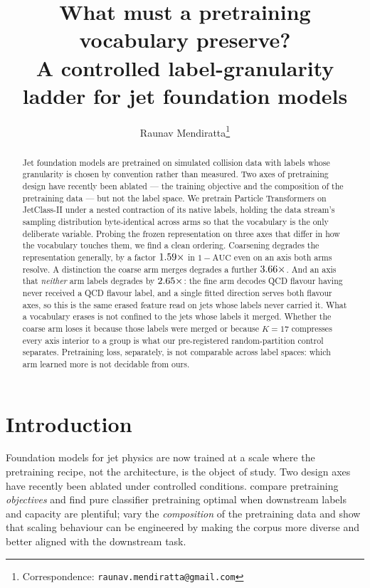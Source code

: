 \documentclass{article}
\title{What must a pretraining vocabulary preserve?\\
       A controlled label-granularity ladder for jet foundation models}
\author{%
  Raunav Mendiratta\thanks{Correspondence: \texttt{raunav.mendiratta@gmail.com}} \\
}
\begin{document}
\maketitle

\begin{abstract}
Jet foundation models are pretrained on simulated collision data with labels
whose granularity is chosen by convention rather than measured. Two axes of
pretraining design have recently been ablated --- the training objective and the
composition of the pretraining data --- but not the label space. We pretrain Particle Transformers on JetClass-II
under a nested contraction of its \Nnative{} native labels, holding the data
stream's sampling distribution byte-identical across arms so that the
vocabulary is the only deliberate variable.
Probing the frozen representation on three axes that differ in how the
vocabulary touches them, we find a clean ordering. Coarsening degrades the
representation generally, by a factor $1.59\times$ in $1-\mathrm{AUC}$ even
on an axis both arms resolve. A distinction the coarse arm merges degrades a
further $3.66\times$. And an axis that \emph{neither} arm labels degrades by
$2.65\times$: the fine arm decodes QCD flavour having never received a QCD
flavour label, and a single fitted direction serves both flavour axes, so this is
the same erased feature read on jets whose labels never carried it. What a
vocabulary erases is not confined to the jets whose labels it merged. Whether the
coarse arm loses it because those labels were merged or because $K=17$ compresses
every axis interior to a group is what our pre-registered random-partition
control separates. Pretraining loss, separately, is not comparable across label
spaces: which arm learned more is not decidable from ours.
\end{abstract}

\section{Introduction}

Foundation models for jet physics are now trained at a scale where the
pretraining recipe, not the architecture, is the object of study. Two design
axes have recently been ablated under controlled conditions. \citet{objectives}
compare pretraining \emph{objectives} and find pure classifier pretraining
optimal when downstream labels and capacity are plentiful; \citet{datacomp} vary
the \emph{composition} of the pretraining data and show that scaling behaviour
can be engineered by making the corpus more diverse and better aligned with the
downstream task.
\end{document}
